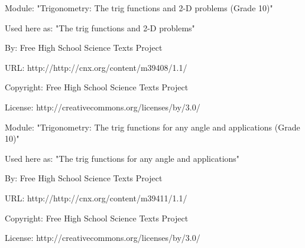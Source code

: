       \par\vspace{9pt}\noindent\begin{minipage}{\textwidth}
      Module: "Trigonometry: The trig functions and 2-D problems (Grade 10)" \par\nopagebreak\noindent
      Used here as: "The trig functions and 2-D problems" \par\nopagebreak\noindent
        By: Free High School Science Texts Project\par\nopagebreak\noindent
      URL: http://http://cnx.org/content/m39408/1.1/\par\nopagebreak\noindent
      \par\nopagebreak\noindent
      Copyright: Free High School Science Texts Project\par\nopagebreak\noindent
      License:  http://creativecommons.org/licenses/by/3.0/\par\nopagebreak\noindent
      \par\end{minipage}
      \par\vspace{9pt}\noindent\begin{minipage}{\textwidth}
      Module: "Trigonometry: The trig functions for any angle and applications (Grade 10)" \par\nopagebreak\noindent
      Used here as: "The trig functions for any angle and applications" \par\nopagebreak\noindent
        By: Free High School Science Texts Project\par\nopagebreak\noindent
      URL: http://http://cnx.org/content/m39411/1.1/\par\nopagebreak\noindent
      \par\nopagebreak\noindent
      Copyright: Free High School Science Texts Project\par\nopagebreak\noindent
      License:  http://creativecommons.org/licenses/by/3.0/\par\nopagebreak\noindent
      \par\end{minipage}
